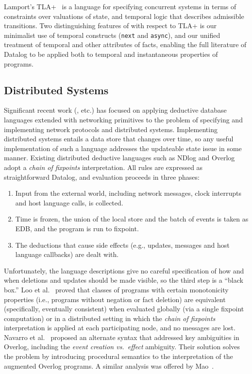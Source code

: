 Lamport's TLA+~\cite{tla} is a language for specifying 
concurrent systems in terms of constraints over valuations of state, and temporal logic that describes admissible transitions.  
Two distinguishing features of \lang with respect to TLA+ is our minimalist use of temporal constructs (\texttt{next} and \texttt{async}), and our unified treatment of temporal and other attributes of facts, enabling the full literature of Datalog to be applied both to temporal and instantaneous properties of programs.

\subsection{Distributed Systems}

Significant recent work (\cite{boom-eurosys,Belaramani:2009,Chu:2007,Loo2009-CACM}, etc.) has focused on applying deductive database languages extended with networking 
primitives to the problem of specifying and implementing network protocols and distributed systems.  Implementing distributed systems entails 
a data store that changes over time, so any useful implementation of such a language addresses the updateable state issue in some manner. 
Existing distributed deductive languages such as NDlog and Overlog adopt a \emph{chain of fixpoints} interpretation.  All rules are expressed as 
straightforward Datalog, and evaluation proceeds in three phases:

\begin{enumerate}
\item Input from the external world, including network messages, clock interrupts and host language calls, is collected.
\item Time is frozen, the union of the local store and the batch of events is taken as EDB, and the program is run to fixpoint.
\item The deductions that cause side effects (e.g., updates, messages and host language callbacks) are dealt with.  
\end{enumerate}

Unfortunately, the language descriptions give no careful specification of how and when deletions and updates
should be made visible, so the third step is a ``black box.''  Loo et al.~\cite{Loo2009-CACM} proved that classes of programs with certain 
monotonicity properties (i.e., programs without negation or fact deletion)
are equivalent (specifically, eventually consistent) when evaluated globally (via a single fixpoint computation) or in a distributed setting in which the 
\emph{chain of fixpoints} interpretation is applied at each participating node, and no messages are lost.
Navarro et al.~\cite{navarro} proposed an alternate syntax that addressed key ambiguities in Overlog, including the
\emph{event creation vs.\ effect} ambiguity.  Their solution solves the problem by introducing procedural semantics to the interpretation of 
the augmented Overlog programs.  A similar analysis was offered by Mao~\cite{Mao2009}.


